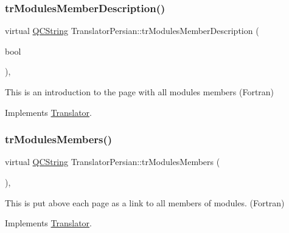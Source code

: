 \mbox{\label{class_translator_persian_a7657ea35e8614f527f2fca992d09c321}} 
\subsubsection{\texorpdfstring{trModulesMemberDescription()}{trModulesMemberDescription()}}
{\footnotesize\ttfamily virtual \mbox{\hyperlink{class_q_c_string}{Q\+C\+String}} Translator\+Persian\+::tr\+Modules\+Member\+Description (\begin{DoxyParamCaption}\item[{bool}]{ }\end{DoxyParamCaption})\hspace{0.3cm}{\ttfamily [inline]}, {\ttfamily [virtual]}}

This is an introduction to the page with all modules members (Fortran) 

Implements \mbox{\hyperlink{class_translator}{Translator}}.

\mbox{\label{class_translator_persian_a77a9115ca4a5c9f88c4f08692a365fb9}} 
\subsubsection{\texorpdfstring{trModulesMembers()}{trModulesMembers()}}
{\footnotesize\ttfamily virtual \mbox{\hyperlink{class_q_c_string}{Q\+C\+String}} Translator\+Persian\+::tr\+Modules\+Members (\begin{DoxyParamCaption}{ }\end{DoxyParamCaption})\hspace{0.3cm}{\ttfamily [inline]}, {\ttfamily [virtual]}}

This is put above each page as a link to all members of modules. (Fortran) 

Implements \mbox{\hyperlink{class_translator}{Translator}}.

\mbox{\label{class_translator_persian_ab0b20b57c138cc952065dae5e6888256}} 
